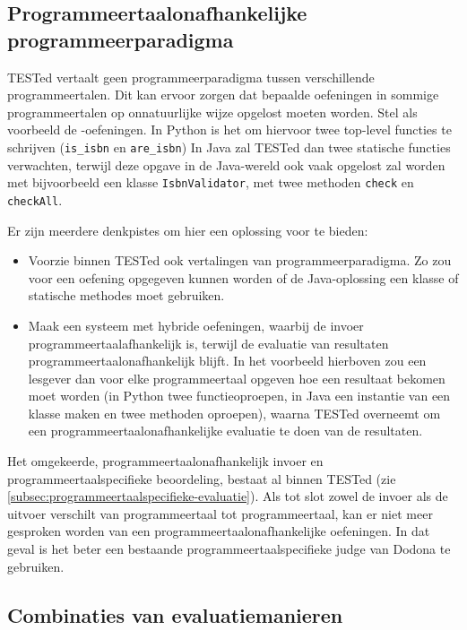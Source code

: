 \subsection{Programmeertaalonafhankelijke programmeerparadigma}\label{subsec:programmeertaalonafhankelijke-programmeerparadigma}

TESTed vertaalt geen programmeerparadigma tussen verschillende programmeertalen.
Dit kan ervoor zorgen dat bepaalde oefeningen in sommige programmeertalen op onnatuurlijke wijze opgelost moeten worden.
Stel als voorbeeld de -oefeningen.
In Python is het  om hiervoor twee top-level functies te schrijven (\texttt{is\_isbn} en \texttt{are\_isbn})
In Java zal TESTed dan twee statische functies verwachten, terwijl deze opgave in de Java-wereld ook vaak opgelost zal worden met bijvoorbeeld een klasse \texttt{IsbnValidator}, met twee methoden \texttt{check} en \texttt{checkAll}.

Er zijn meerdere denkpistes om hier een oplossing voor te bieden:

\begin{itemize}
    \item Voorzie binnen TESTed ook vertalingen van programmeerparadigma.
    Zo zou voor een oefening opgegeven kunnen worden of de Java-oplossing een klasse of statische methodes moet gebruiken.
    \item Maak een systeem met hybride oefeningen, waarbij de invoer programmeertaalafhankelijk is, terwijl de evaluatie van resultaten programmeertaalonafhankelijk blijft.
    In het voorbeeld hierboven zou een lesgever dan voor elke programmeertaal opgeven hoe een resultaat bekomen moet worden (in Python twee functieoproepen, in Java een instantie van een klasse maken en twee methoden oproepen), waarna TESTed overneemt om een programmeertaalonafhankelijke evaluatie te doen van de resultaten.
\end{itemize}

Het omgekeerde, programmeertaalonafhankelijk invoer en programmeertaalspecifieke beoordeling, bestaat al binnen TESTed (zie \cref{subsec:programmeertaalspecifieke-evaluatie}).
Als tot slot zowel de invoer als de uitvoer verschilt van programmeertaal tot programmeertaal, kan er niet meer gesproken worden van een programmeertaalonafhankelijke oefeningen.
In dat geval is het beter een bestaande programmeertaalspecifieke judge van Dodona te gebruiken.

\subsection{Combinaties van evaluatiemanieren}\label{subsec:combinaties-van-evaluatiemanieren}

